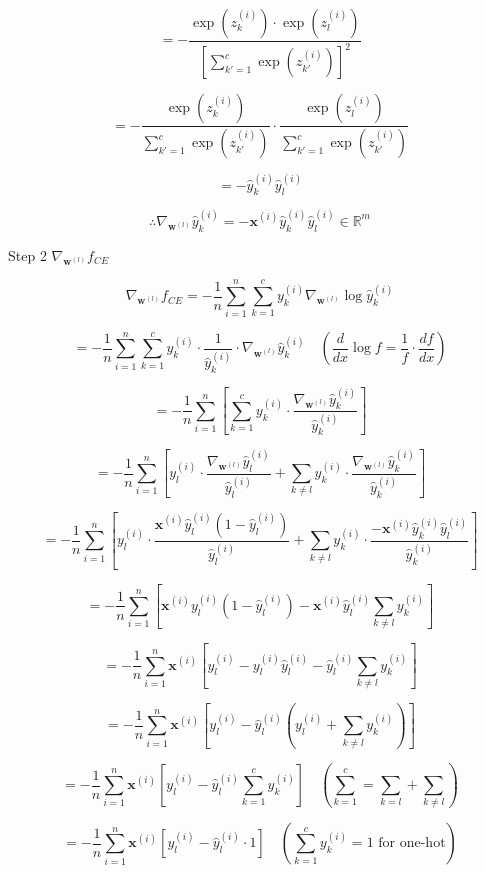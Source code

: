\documentclass[
  letterpaper,
  DIV=11,
  numbers=noendperiod]{scrartcl}
\begin{document}
\[= -\frac{\exp(z_k^{(i)}) \cdot \exp(z_l^{(i)})}{[\sum_{k'=1}^c \exp(z_{k'}^{(i)})]^2}\]

\[= -\frac{\exp(z_k^{(i)})}{\sum_{k'=1}^c \exp(z_{k'}^{(i)})} \cdot \frac{\exp(z_l^{(i)})}{\sum_{k'=1}^c \exp(z_{k'}^{(i)})}\]

\[= -\hat{y}_k^{(i)} \hat{y}_l^{(i)}\]

\[\therefore \nabla_{\mathbf{w}^{(l)}} \hat{y}_k^{(i)} = -\mathbf{x}^{(i)} \hat{y}_k^{(i)} \hat{y}_l^{(i)} \in \mathbb{R}^m\]

Step 2 \(\nabla_{\mathbf{w}^{(l)}} f_{CE}\)

\[\nabla_{\mathbf{w}^{(l)}} f_{CE} = -\frac{1}{n}\sum_{i=1}^n\sum_{k=1}^c y_k^{(i)} \nabla_{\mathbf{w}^{(l)}} \log \hat{y}_k^{(i)}\]

\[= -\frac{1}{n}\sum_{i=1}^n\sum_{k=1}^c y_k^{(i)} \cdot \frac{1}{\hat{y}_k^{(i)}} \cdot \nabla_{\mathbf{w}^{(l)}} \hat{y}_k^{(i)} \quad \left(\frac{d}{dx}\log f = \frac{1}{f} \cdot \frac{df}{dx}\right)\]

\[= -\frac{1}{n}\sum_{i=1}^n\left[\sum_{k=1}^c y_k^{(i)} \cdot \frac{\nabla_{\mathbf{w}^{(l)}} \hat{y}_k^{(i)}}{\hat{y}_k^{(i)}}\right]\]

\[= -\frac{1}{n}\sum_{i=1}^n\left[y_l^{(i)} \cdot \frac{\nabla_{\mathbf{w}^{(l)}} \hat{y}_l^{(i)}}{\hat{y}_l^{(i)}} + \sum_{k \neq l} y_k^{(i)} \cdot \frac{\nabla_{\mathbf{w}^{(l)}} \hat{y}_k^{(i)}}{\hat{y}_k^{(i)}}\right]\]

\[= -\frac{1}{n}\sum_{i=1}^n\left[y_l^{(i)} \cdot \frac{\mathbf{x}^{(i)} \hat{y}_l^{(i)}(1 - \hat{y}_l^{(i)})}{\hat{y}_l^{(i)}} + \sum_{k \neq l} y_k^{(i)} \cdot \frac{-\mathbf{x}^{(i)} \hat{y}_k^{(i)} \hat{y}_l^{(i)}}{\hat{y}_k^{(i)}}\right]\]

\[= -\frac{1}{n}\sum_{i=1}^n\left[\mathbf{x}^{(i)} y_l^{(i)} (1 - \hat{y}_l^{(i)}) - \mathbf{x}^{(i)} \hat{y}_l^{(i)} \sum_{k \neq l} y_k^{(i)}\right]\]

\[= -\frac{1}{n}\sum_{i=1}^n \mathbf{x}^{(i)} \left[y_l^{(i)} - y_l^{(i)} \hat{y}_l^{(i)} - \hat{y}_l^{(i)} \sum_{k \neq l} y_k^{(i)}\right]\]

\[= -\frac{1}{n}\sum_{i=1}^n \mathbf{x}^{(i)} \left[y_l^{(i)} - \hat{y}_l^{(i)} \left(y_l^{(i)} + \sum_{k \neq l} y_k^{(i)}\right)\right]\]

\[= -\frac{1}{n}\sum_{i=1}^n \mathbf{x}^{(i)} \left[y_l^{(i)} - \hat{y}_l^{(i)} \sum_{k=1}^c y_k^{(i)}\right] \quad \left(\sum_{k=1}^c = \sum_{k=l} + \sum_{k \neq l}\right)\]

\[= -\frac{1}{n}\sum_{i=1}^n \mathbf{x}^{(i)} \left[y_l^{(i)} - \hat{y}_l^{(i)} \cdot 1\right] \quad \left(\sum_{k=1}^c y_k^{(i)} = 1 \text{ for one-hot}\right)\]
\end{document}
